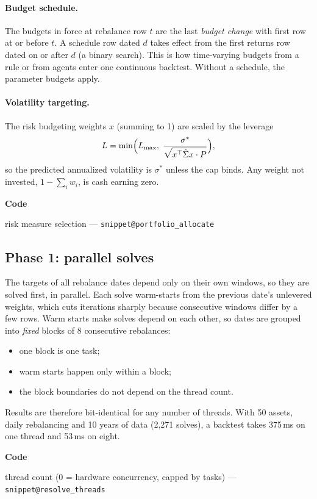 \documentclass[11pt,a4paper]{article}
\makeatletter
\newcommand{\snippetsource}[1]{\csname snippet@#1\endcsname}
\newcommand{\snippet}[3]{%
  }
\newenvironment{codepointers}{%
  \par\smallskip\begingroup\footnotesize\noindent\textcolor{blue!50!black}{\textbf{Code}}\par\nopagebreak
  \begin{list}{}{\setlength{\leftmargin}{1.2em}\setlength{\itemsep}{0pt}\setlength{\parsep}{0pt}\setlength{\topsep}{1pt}}}%
  {\end{list}\endgroup\smallskip}
\newcommand{\codeitem}[2]{\item #2 --- \texttt{\snippetsource{#1}}}
\makeatother
\begin{document}
\paragraph{Budget schedule.} The budgets in force at rebalance row $t$ are the last
\emph{budget change} with first row at or before $t$. A schedule row dated $d$ takes effect
from the first returns row dated on or after $d$ (a binary search). This is how
time-varying budgets from a rule or from agents enter one continuous backtest. Without a
schedule, the parameter budgets apply.

\paragraph{Volatility targeting.} The risk budgeting weights $x$ (summing to 1) are scaled
by the leverage
\[
  L=\min\!\Big(L_{\max},\;\frac{\sigma^\ast}{\sqrt{x^\top\hat\Sigma x\cdot P}}\Big),
\]
so the predicted annualized volatility is $\sigma^\ast$ unless the cap binds. Any weight
not invested, $1-\sum_iw_i$, is cash earning zero.
\snippet{schedule_rows}{C++}{Schedule dates to first rows}
\snippet{budgets_at}{C++}{Budgets in force at a rebalance}
\snippet{solve_target}{C++}{Target weights of one rebalance date}
\begin{codepointers}
  \codeitem{portfolio_allocate}{risk measure selection}
\end{codepointers}

\subsection{Phase 1: parallel solves}
The targets of all rebalance dates depend only on their own windows, so they are solved
first, in parallel. Each solve warm-starts from the previous date's unlevered weights,
which cuts iterations sharply because consecutive windows differ by a few rows. Warm
starts make solves depend on each other, so dates are grouped into \emph{fixed} blocks of 8
consecutive rebalances:
\begin{itemize}
  \item one block is one task;
  \item warm starts happen only within a block;
  \item the block boundaries do not depend on the thread count.
\end{itemize}
Results are therefore bit-identical for any number of threads. With 50 assets, daily
rebalancing and 10 years of data (2,271 solves), a backtest takes 375\,ms on one thread and
53\,ms on eight.
\snippet{engine_phase1}{C++}{Phase 1}
\snippet{parallel_for}{C++}{Thread pool helper}
\begin{codepointers}
  \codeitem{resolve_threads}{thread count (0 = hardware concurrency, capped by tasks)}
\end{codepointers}
\end{document}
